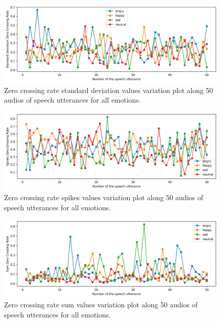 \begin{figure}[H]
	\centering
	\includegraphics[width=\linewidth]{figs/appendix/feature_selection/stdZCRVar.png}
	\caption{Zero crossing rate standard deviation values variation plot along 50 audios of speech utterances for all emotions.}
	\label{fig:stdZCRVar}
\end{figure}

\begin{figure}[H]
	\centering
	\includegraphics[width=\linewidth]{figs/appendix/feature_selection/spikesZCRVar.png}
	\caption{Zero crossing rate spikes values variation plot along 50 audios of speech utterances for all emotions.}
	\label{fig:spikesZCRVar}
\end{figure}

\begin{figure}[H]
	\centering
	\includegraphics[width=\linewidth]{figs/appendix/feature_selection/sumZCRVar.png}
	\caption{Zero crossing rate sum values variation plot along 50 audios of speech utterances for all emotions.}
	\label{fig:sumZCRVar}
\end{figure}


